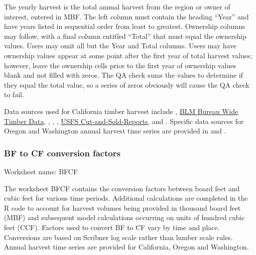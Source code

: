 \documentclass[
  openany]{book}
\begin{document}
The yearly harvest is the total annual harvest from the region or owner of interest, entered in MBF. The left column must contain the heading ``Year'' and have years listed in sequential order from least to greatest. Ownership columns may follow, with a final column entitled ``Total'' that must equal the ownership values. Users may omit all but the Year and Total columns. Users may have ownership values appear at some point after the first year of total harvest values; however, leave the ownership cells prior to the first year of ownership values blank and not filled with zeros. The QA check sums the values to determine if they equal the total value, so a series of zeros obviously will cause the QA check to fail.

Data sources used for California timber harvest include \textcite{bolsinger1976}, \href{https://www.blm.gov/programs/natural-resources/forests-and-woodlands/timber-sales/bureau-wide-timber-data}{BLM Bureau Wide Timber Data}, \textcite{morgan2004}, \textcite{morgan2012}, \textcite{mciver2015}, \href{https://www.fs.fed.us/forestmanagement/products/cut-sold/index.shtml}{USFS Cut-and-Sold-Reports}, and \textcite{warren2005}. Specific data sources for Oregon and Washington annual harvest time series are provided in \textcite{morgan2021} and \textcite{nichols2020}.

\hypertarget{own-prov-input-bfcf}{%
\subsubsection{BF to CF conversion factors}\label{own-prov-input-bfcf}}

Worksheet name: BFCF

The worksheet BFCF contains the conversion factors between board feet and cubic feet for various time periods. Additional calculations are completed in the R code to account for harvest volumes being provided in thousand board feet (MBF) and subsequent model calculations occurring on units of hundred cubic feet (CCF). Factors used to convert BF to CF vary by time and place. Conversions are based on Scribner log scale rather than lumber scale rules. Annual harvest time series are provided for California, Oregon and Washington.
\end{document}
